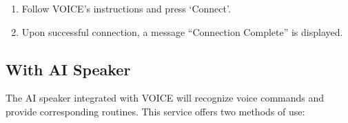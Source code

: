 \documentclass[conference]{IEEEtran}
\begin{document}
\begin{enumerate}[label=\arabic*]
\begin{enumerate}[label=\arabic*)]
\begin{enumerate}[label=\alph*)]
            \vspace{0.5em}

            \item Follow VOICE's instructions and press ‘Connect’.

            \vspace{0.5em}

            \item Upon successful connection, a message “Connection Complete” is displayed. 
        \end{enumerate}
    \end{enumerate}
\end{enumerate}

\vspace{0.7em} %

\subsection{With AI Speaker}
The AI speaker integrated with VOICE will recognize voice commands and provide corresponding routines. This service offers two methods of use:
\vspace{0.5em}
\end{document}
